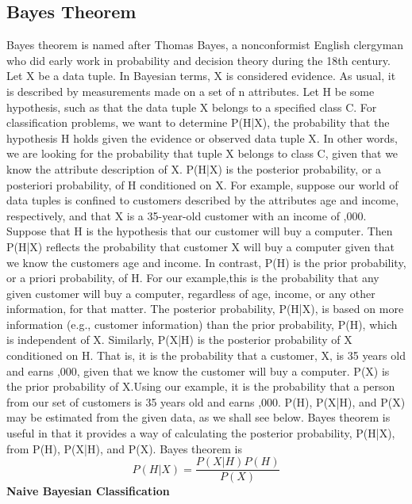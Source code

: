 \documentclass[journal]{IEEEtran}
\begin{document}
\subsection{Bayes Theorem}
Bayes theorem is named after Thomas Bayes, a nonconformist English clergyman who did early work in probability and decision theory during the 18th century\cite{nb1}. Let X be a data tuple. In Bayesian terms, X is considered evidence. As usual, it is described by measurements made on a set of n attributes. Let H be some hypothesis, such as that the data tuple X belongs to a specified class C. For classification problems, we want to determine P(H|X), the probability that the hypothesis H holds given the evidence or observed data tuple X. In other words, we are looking for the probability that tuple X belongs to class C, given that we know the attribute description of X.
P(H|X) is the posterior probability, or a posteriori probability, of H conditioned on X. For example, suppose our world of data tuples is confined to customers described by the attributes age and income, respectively, and that X is a 35-year-old customer with an income of ,000. Suppose that H is the hypothesis that our customer will buy a computer. Then P(H|X) reflects the probability that customer X will buy a computer given that we know the customers age and income.
In contrast, P(H) is the prior probability, or a priori probability, of H. For our example,this is the probability that any given customer will buy a computer, regardless of age, income, or any other information, for that matter. The posterior probability, P(H|X), is based on more information (e.g., customer information) than the prior probability, P(H), which is independent of X. Similarly, P(X|H) is the posterior probability of X conditioned on H. That is, it is the probability that a customer, X, is 35 years old and earns ,000, given that we know the customer will buy a computer.
P(X) is the prior probability of X.Using our example, it is the probability that a person from our set of customers is 35 years old and earns ,000. P(H), P(X|H), and P(X) may be estimated from the given data, as we shall see below. Bayes theorem is useful in that it provides a way of calculating the posterior probability, P(H|X), from P(H), P(X|H), and P(X). Bayes theorem is
\begin{equation}
	P(H|X)=\frac{P(X|H)P(H)}{P(X)}\end{equation}\newline
\textbf{Naive Bayesian Classification}\newline
\end{document}
